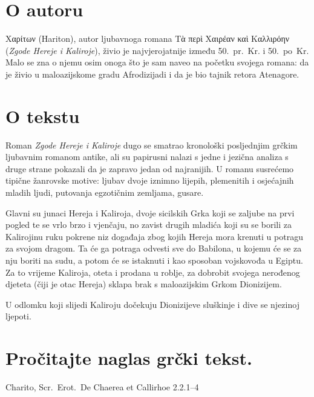 \section*{O autoru}

\textgreek[variant=ancient]{Χαρίτων} (Hariton), autor ljubavnoga romana \textgreek[variant=ancient]{Τὰ περὶ Χαιρέαν καὶ Καλλιρόην} (\textit{Zgode Hereje i Kaliroje}), živio je najvjerojatnije između 50.\ pr.~Kr. i 50.\ po~Kr. Malo se zna o njemu osim onoga što je sam naveo na početku svojega romana: da je živio u maloazijskome gradu Afrodizijadi i da je bio tajnik retora Atenagore.

\section*{O tekstu}

Roman \textit{Zgode Hereje i Kaliroje} dugo se smatrao kronološki posljednjim grčkim ljubavnim romanom antike, ali su papirusni nalazi s jedne i jezična analiza s druge strane pokazali da je zapravo jedan od najranijih. U romanu susrećemo tipične žanrovske motive: ljubav dvoje iznimno lijepih, plemenitih i osjećajnih mladih ljudi, putovanja egzotičnim zemljama, gusare.

Glavni su junaci Hereja i Kaliroja, dvoje sicilskih Grka koji se zaljube na prvi pogled te se vrlo brzo i vjenčaju, no zavist drugih mladića koji su se borili za Kalirojinu ruku pokrene niz događaja zbog kojih Hereja mora krenuti u potragu za svojom dragom. Ta će ga potraga odvesti sve do Babilona, u kojemu će se za nju boriti na sudu, a potom će se istaknuti i kao sposoban vojskovođa u Egiptu. Za to vrijeme Kaliroja, oteta i prodana u roblje, za dobrobit svojega nerođenog djeteta (čiji je otac Hereja) sklapa brak s maloazijskim Grkom Dionizijem. 

U odlomku koji slijedi Kaliroju dočekuju Dionizijeve sluškinje i dive se njezinoj ljepoti.



\section*{Pročitajte naglas grčki tekst.}

Charito, Scr.\ Erot.\ De Chaerea et Callirhoe 2.2.1–4

\medskip


